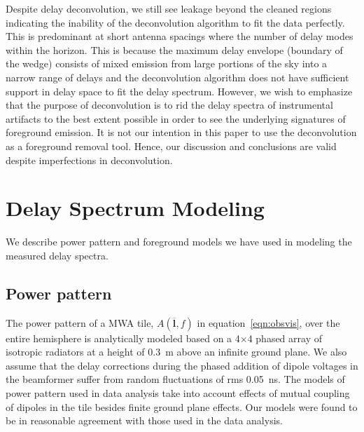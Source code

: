 \documentclass[preprint2,iop,numberedappendix]{emulateapj}
\begin{document}
Despite delay deconvolution, we still see leakage beyond the cleaned regions indicating the inability of the deconvolution algorithm to fit the data perfectly. This is predominant at short antenna spacings where the number of delay modes within the horizon. This is because the maximum delay envelope (boundary of the wedge) consists of mixed emission from large portions of the sky into a narrow range of delays and the deconvolution algorithm does not have sufficient support in delay space to fit the delay spectrum. However, we wish to emphasize that the purpose of deconvolution is to rid the delay spectra of instrumental artifacts to the best extent possible in order to see the underlying signatures of foreground emission. It is not our intention in this paper to use the deconvolution as a foreground removal tool. Hence, our discussion and conclusions are valid despite imperfections in deconvolution.

\section{Delay Spectrum Modeling}\label{sec:modeling}

We describe power pattern and foreground models we have used in modeling the measured delay spectra. 

\subsection{Power pattern}\label{sec:power_pattern}

The power pattern of a MWA tile, $A(\overline{\mathbf{l}},f)$ in equation~\ref{eqn:obsvis}, over the entire hemisphere is analytically modeled based on a 4$\times$4 phased array of isotropic radiators at a height of 0.3~m above an infinite ground plane. We also assume that the delay corrections during the phased addition of dipole voltages in the beamformer suffer from random fluctuations of rms 0.05~ns. The models of power pattern used in data analysis take into account effects of mutual coupling of dipoles in the tile besides finite ground plane effects. Our models were found to be in reasonable agreement with those used in the data analysis. 
\end{document}
